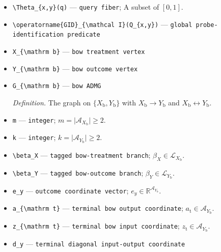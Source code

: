 \documentclass{article}
\begin{document}
\begin{itemize}
  \item \texttt{\textbackslash{}\allowbreak{}Theta\_\allowbreak{}\{x,\allowbreak{}y\}\allowbreak{}(q)} --- \texttt{query fiber}; A subset of \([0,1]\).
  \item \texttt{\textbackslash{}\allowbreak{}operatorname\{GID\}\allowbreak{}\_\allowbreak{}\{\textbackslash{}\allowbreak{}mathcal I\}\allowbreak{}(Q\_\allowbreak{}\{x,\allowbreak{}y\}\allowbreak{})} --- \texttt{global probe-\allowbreak{}identification predicate}
  \item \texttt{X\_\allowbreak{}\{\textbackslash{}\allowbreak{}mathrm b\}\allowbreak{}} --- \texttt{bow treatment vertex}
  \item \texttt{Y\_\allowbreak{}\{\textbackslash{}\allowbreak{}mathrm b\}\allowbreak{}} --- \texttt{bow outcome vertex}
  \item \texttt{G\_\allowbreak{}\{\textbackslash{}\allowbreak{}mathrm b\}\allowbreak{}} --- \texttt{bow ADMG}
  \par\smallskip\noindent\emph{Definition.} The graph on \(\{X_{\mathrm b},Y_{\mathrm b}\}\) with \(X_{\mathrm b}\to Y_{\mathrm b}\) and \(X_{\mathrm b}\leftrightarrow Y_{\mathrm b}\).
  \item \texttt{m} --- \texttt{integer}; \(m=\lvert\mathcal A_{X_{\mathrm b}}\rvert\ge2\).
  \item \texttt{k} --- \texttt{integer}; \(k=\lvert\mathcal A_{Y_{\mathrm b}}\rvert\ge2\).
  \item \texttt{\textbackslash{}\allowbreak{}beta\_\allowbreak{}X} --- \texttt{tagged bow-\allowbreak{}treatment branch}; \(\beta_X\in\mathcal L_{X_{\mathrm b}}\).
  \item \texttt{\textbackslash{}\allowbreak{}beta\_\allowbreak{}Y} --- \texttt{tagged bow-\allowbreak{}outcome branch}; \(\beta_Y\in\mathcal L_{Y_{\mathrm b}}\).
  \item \texttt{e\_\allowbreak{}y} --- \texttt{outcome coordinate vector}; \(e_y\in\mathbb R^{\mathcal A_{Y_{\mathrm b}}}\).
  \item \texttt{a\_\allowbreak{}\{\textbackslash{}\allowbreak{}mathrm t\}\allowbreak{}} --- \texttt{terminal bow output coordinate}; \(a_{\mathrm t}\in\mathcal A_{Y_{\mathrm b}}\).
  \item \texttt{z\_\allowbreak{}\{\textbackslash{}\allowbreak{}mathrm t\}\allowbreak{}} --- \texttt{terminal bow input coordinate}; \(z_{\mathrm t}\in\mathcal A_{Y_{\mathrm b}}\).
  \item \texttt{d\_\allowbreak{}y} --- \texttt{terminal diagonal input-\allowbreak{}output coordinate}

\end{itemize}
\end{document}
